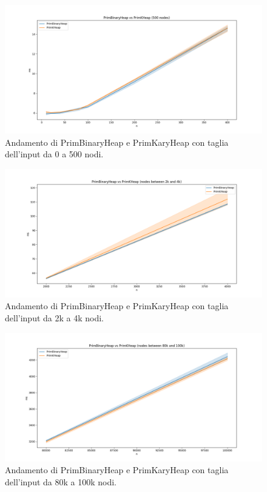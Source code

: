 \begin{figure}[H]
    \centering
    \includegraphics[width=1.0\textwidth]{./images/PrimBinaryHeap_vs_PrimKHeap_(500_nodes).png}
	\caption{Andamento di PrimBinaryHeap e PrimKaryHeap con taglia dell'input da 0 a 500 nodi.}
    \label{fig:Prim2vsPrim4-500}
\end{figure}

\begin{figure}[H]
    \centering
    \includegraphics[width=1.0\textwidth]{./images/PrimBinaryHeap_vs_PrimKHeap_(nodes_between_2k_and_4k).png}
	\caption{Andamento di PrimBinaryHeap e PrimKaryHeap con taglia dell'input da 2k a 4k nodi.}
    \label{fig:Prim2vsPrim4-2k-4k}
\end{figure}

\begin{figure}[H]
    \centering
    \includegraphics[width=1.0\textwidth]{./images/PrimBinaryHeap_vs_PrimKHeap_(nodes_between_80k_and_100k).png}
	\caption{Andamento di PrimBinaryHeap e PrimKaryHeap con taglia dell'input da 80k a 100k nodi.}
    \label{fig:Prim2vsPrim4-80k-100k}
\end{figure}

